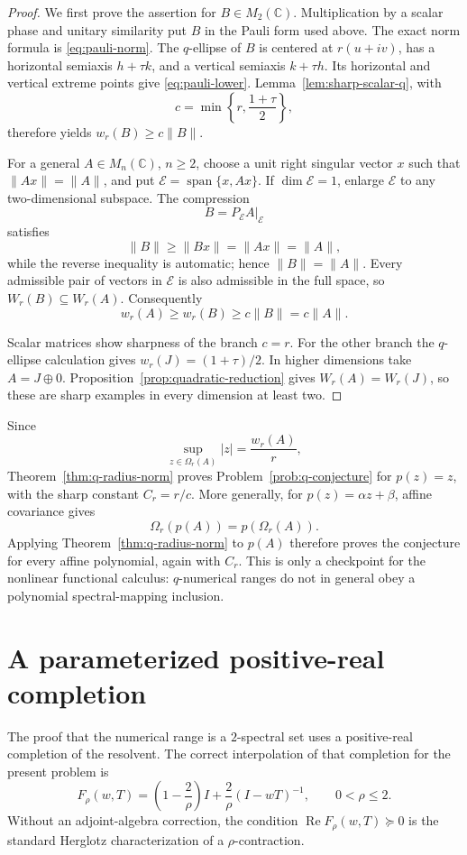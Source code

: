 \documentclass[11pt]{article}
\theoremstyle{remark}
\newcommand{\C}{\mathbb C}
\newcommand{\RePart}{\operatorname{Re}}
\newcommand{\spn}{\operatorname{span}}
\begin{document}
\begin{proof}
We first prove the assertion for \(B\in M_2(\C)\).  Multiplication by
a scalar phase and unitary similarity put \(B\) in the Pauli form
used above.  The exact norm formula is \eqref{eq:pauli-norm}.
The \(q\)-ellipse of \(B\) is centered at \(r(u+iv)\), has a
horizontal semiaxis \(h+\tau k\), and a vertical semiaxis
\(k+\tau h\).  Its horizontal and vertical extreme points give
\eqref{eq:pauli-lower}.  Lemma~\ref{lem:sharp-scalar-q}, with
\[
 c=\min\left\{r,\frac{1+\tau}{2}\right\},
\]
therefore yields \(w_r(B)\geq c\|B\|\).

For a general \(A\in M_n(\C)\), \(n\geq2\), choose a unit right singular vector
\(x\) such that \(\|Ax\|=\|A\|\), and put
\(\mathcal E=\spn\{x,Ax\}\).  If \(\dim\mathcal E=1\), enlarge
\(\mathcal E\) to any two-dimensional subspace.  The compression
\[
 B=P_{\mathcal E}A|_{\mathcal E}
\]
satisfies
\[
 \|B\|\geq\|Bx\|=\|Ax\|=\|A\|,
\]
while the reverse inequality is automatic; hence \(\|B\|=\|A\|\).
Every admissible pair of vectors in \(\mathcal E\) is also admissible
in the full space, so \(W_r(B)\subseteq W_r(A)\).  Consequently
\[
 w_r(A)\geq w_r(B)\geq c\|B\|=c\|A\|.
\]

Scalar matrices show sharpness of the branch \(c=r\).  For the other
branch the \(q\)-ellipse calculation gives
\(w_r(J)=(1+\tau)/2\).  In higher dimensions take
\(A=J\oplus0\).  Proposition~\ref{prop:quadratic-reduction} gives
\(W_r(A)=W_r(J)\), so these are sharp examples in every dimension at
least two.
\end{proof}

Since
\[
 \sup_{z\in\Omega_r(A)}|z|=\frac{w_r(A)}r,
\]
Theorem~\ref{thm:q-radius-norm} proves
Problem~\ref{prob:q-conjecture} for \(p(z)=z\), with the sharp
constant \(C_r=r/c\).  More generally, for
\(p(z)=\alpha z+\beta\), affine covariance gives
\[
 \Omega_r(p(A))=p(\Omega_r(A)).
\]
Applying Theorem~\ref{thm:q-radius-norm} to \(p(A)\) therefore proves
the conjecture for every affine polynomial, again with \(C_r\).
This is only a checkpoint for the nonlinear functional calculus:
\(q\)-numerical ranges do not in general obey a polynomial
spectral-mapping inclusion.

\section{A parameterized positive-real completion}
\label{sec:parameterized-completion}

The proof that the numerical range is a \(2\)-spectral set uses a
positive-real completion of the resolvent.  The correct interpolation
of that completion for the present problem is
\[
 F_\rho(w,T)
 =
 \left(1-\frac2\rho\right)I+
 \frac2\rho(I-wT)^{-1},
 \qquad 0<\rho\leq2.
\]
Without an adjoint-algebra correction, the condition
\(\RePart F_\rho(w,T)\succeq0\) is the standard Herglotz
characterization of a \(\rho\)-contraction.
\end{document}
